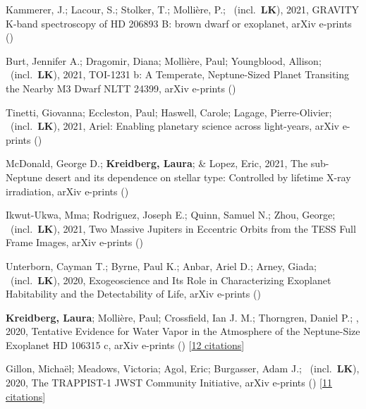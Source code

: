 \item[{\color{numcolor}\scriptsize17}] Kammerer, J.; Lacour, S.; Stolker, T.; Molli{\`e}re, P.; \etal\ (incl.\ \textbf{LK}), 2021, GRAVITY K-band spectroscopy of HD 206893 B: brown dwarf or exoplanet, arXiv e-prints ()

\item[{\color{numcolor}\scriptsize16}] Burt, Jennifer A.; Dragomir, Diana; Molli{\`e}re, Paul; Youngblood, Allison; \etal\ (incl.\ \textbf{LK}), 2021, TOI-1231 b: A Temperate, Neptune-Sized Planet Transiting the Nearby M3 Dwarf NLTT 24399, arXiv e-prints ()

\item[{\color{numcolor}\scriptsize15}] Tinetti, Giovanna; Eccleston, Paul; Haswell, Carole; Lagage, Pierre-Olivier; \etal\ (incl.\ \textbf{LK}), 2021, Ariel: Enabling planetary science across light-years, arXiv e-prints ()

\item[{\color{numcolor}\scriptsize14}] McDonald, George D.; \textbf{Kreidberg, Laura}; \& Lopez, Eric, 2021, The sub-Neptune desert and its dependence on stellar type: Controlled by lifetime X-ray irradiation, arXiv e-prints ()

\item[{\color{numcolor}\scriptsize13}] Ikwut-Ukwa, Mma; Rodriguez, Joseph E.; Quinn, Samuel N.; Zhou, George; \etal\ (incl.\ \textbf{LK}), 2021, Two Massive Jupiters in Eccentric Orbits from the TESS Full Frame Images, arXiv e-prints ()

\item[{\color{numcolor}\scriptsize12}] Unterborn, Cayman T.; Byrne, Paul K.; Anbar, Ariel D.; Arney, Giada; \etal\ (incl.\ \textbf{LK}), 2020, Exogeoscience and Its Role in Characterizing Exoplanet Habitability and the Detectability of Life, arXiv e-prints ()

\item[{\color{numcolor}\scriptsize11}] \textbf{Kreidberg, Laura}; Molli{\`e}re, Paul; Crossfield, Ian J. M.; Thorngren, Daniel P.; \etal, 2020, Tentative Evidence for Water Vapor in the Atmosphere of the Neptune-Size Exoplanet HD 106315 c, arXiv e-prints () [\href{https://ui.adsabs.harvard.edu/abs/2020arXiv200607444K}{12 citations}]

\item[{\color{numcolor}\scriptsize10}] Gillon, Micha{\"e}l; Meadows, Victoria; Agol, Eric; Burgasser, Adam J.; \etal\ (incl.\ \textbf{LK}), 2020, The TRAPPIST-1 JWST Community Initiative, arXiv e-prints () [\href{https://ui.adsabs.harvard.edu/abs/2020arXiv200204798G}{11 citations}]

